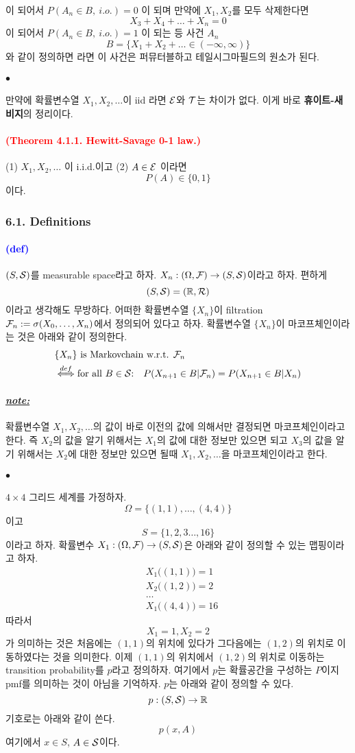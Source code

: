 \documentclass[12pt,oneside,english]{book}
\def\ck{\paragraph{\Large$\bullet$}\Large}
\def\note{\paragraph{\Large\textit{\underline{note:}}}\Large}
\newcommand{\parablue}[1]{\paragraph{\Large\textcolor{blue}{(#1)}}\Large}
\newcommand{\parared}[1]{\paragraph{\Large\textcolor{red}{(#1)}}\Large}
\begin{document}
이 되어서 $P(A_n\in B, ~i.o.)=0$ 이 되며 만약에 $X_1,X_2$를 모두 삭제한다면 
\[
X_3+X_4+\dots+X_n=0
\]
이 되어서 $P(A_n\in B, ~i.o.)=1$ 이 되는 등 사건 $A_n$
\[
B=\{X_1+X_2+\dots \in (-\infty, \infty) \}
\]
와 같이 정의하면 라면 이 사건은 퍼뮤터블하고 테일시그마필드의 원소가 된다. 

\ck 만약에 확률변수열 $X_1,X_2,\dots$이 iid 라면 ${\cal E}$와 ${\cal T}$는 차이가 없다. 이게 바로 \textbf{휴이트-새비지}의 정리이다. 

\parared{Theorem 4.1.1. Hewitt-Savage 0-1 law.} 
(1) $X_1,X_2,\dots$ 이 i.i.d.이고 (2) $A \in {\cal E}$ 이라면 
\[
P(A) \in \{0,1\}
\]
이다. 



\subsubsection{6.1. Definitions}
\parablue{def} $(S,{\cal S})$를 measurable space라고 하자. $X_n:(\Omega,{\cal F}) \to (S,{\cal S})$이라고 하자. 편하게 
\[
(S,{\cal S})=(\mathbb{R},{\cal R})
\]
이라고 생각해도 무방하다. 어떠한 확률변수열 $\{X_n\}$이 filtration ${\cal F}_n:=\sigma(X_0,\dots,X_n)$에서 정의되어 있다고 하자. 확률변수열 $\{X_n\}$이 마코프체인이라는 것은 아래와 같이 정의한다. 
\begin{align*}
& \{X_n\} \mbox{ is Markovchain w.r.t. } {\cal F}_n \\
& \overset{def}{\Longleftrightarrow} \mbox{for all $B\in {\cal S}$:}\quad 
P(X_{n+1}\in B | {\cal F}_n)=P(X_{n+1}\in B | X_n)
\end{align*}

\note 확률변수열 $X_1,X_2,\dots$의 값이 바로 이전의 값에 의해서만 결정되면 마코프체인이라고 한다. 즉 $X_2$의 값을 알기 위해서는 $X_1$의 값에 대한 정보만 있으면 되고 $X_3$의 값을 알기 위해서는 $X_2$에 대한 정보만 있으면 될때 $X_1,X_2,\dots$을 마코프체인이라고 한다. 

\ck $4\times 4$ 그리드 세계를 가정하자. 
\[
\Omega=\{(1,1),\dots,(4,4)\}
\]
이고 
\[
S=\{1,2,3\dots,16\}
\]
이라고 하자. 확률변수 $X_1:(\Omega,{\cal F}) \to (S, {\cal S})$은 아래와 같이 정의할 수 있는 맵핑이라고 하자. 
\begin{align*}
& X_1\big((1,1)\big)=1\\ 
& X_2\big((1,2))=2\\ 
& \dots \\
& X_1\big((4,4)\big)=16
\end{align*}
따라서 
\[
X_1=1, X_2=2
\]
가 의미하는 것은 처음에는 $(1,1)$의 위치에 있다가 그다음에는 $(1,2)$의 위치로 이동하였다는 것을 의미한다. 이제 $(1,1)$의 위치에서 $(1,2)$의 위치로 이동하는 transition probability를 $p$라고 정의하자. 여기에서 $p$는 확률공간을 구성하는 $P$이지 pmf를 의미하는 것이 아님을 기억하자. $p$는 아래와 같이 정의할 수 있다. 
\[
p:(S,{\cal S}) \to \mathbb{R}
\]
기호로는 아래와 같이 쓴다. 
\[
p(x,A)
\]
여기에서 $x \in S$, $A \in {\cal S}$이다. 
\end{document}

